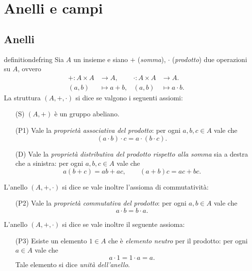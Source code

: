 \chapter{Anelli e campi}

\section{Anelli}

\begin{restatable}[Anello]{definition}{defring}
    \label{def:ring}
    Sia $A$ un insieme e siano $+$ (\emph{somma}), $\cdot$ (\emph{prodotto}) due operazioni su $A$, ovvero \begin{align*}
        + : A \times A &\to A, & \cdot : A \times A &\to A. \\
        (a, b) &\mapsto a+b,      &             (a, b) &\mapsto a\cdot b.
    \end{align*} La struttura $(A, +, \cdot)$ si dice  se valgono i seguenti assiomi:
    \begin{itemize}
        \item[(S)] $(A, +)$ è un gruppo abeliano.
        \item[(P1)] Vale la \emph{proprietà associativa del prodotto}:            
        per ogni $a, b, c \in A$ vale che \[
            (a \cdot b) \cdot c = a \cdot (b \cdot c).
        \]
        \item[(D)] \label{def:anello:distr} Vale la \emph{proprietà distributiva del prodotto rispetto alla somma} sia a destra che a sinistra:         
        per ogni $a, b, c \in A$ vale che \[
            a(b + c) = ab + ac, \qquad (a + b)c = ac + bc.
        \]
    \end{itemize}
    L'anello $(A, +, \cdot)$ si dice  se vale inoltre l'assioma di commutatività:
    \begin{itemize}
        \item[(P2)] \label{def:anello_prod:com} Vale la \emph{proprietà commutativa del prodotto}:
        per ogni $a, b \in A$ vale che \[
            a \cdot b = b \cdot a.
        \]
    \end{itemize}
    L'anello $(A, +, \cdot)$ si dice  se vale inoltre il seguente assioma:
    \begin{itemize}
        \item[(P3)] \label{def:anello_prod:unit} Esiste un elemento $1 \in A$ che è \emph{elemento neutro} per il prodotto:
        per ogni $a \in A$ vale che \[
            a \cdot 1 = 1 \cdot a = a.
        \]
        Tale elemento si dice \emph{unità dell'anello}.
    \end{itemize}
\end{restatable}

